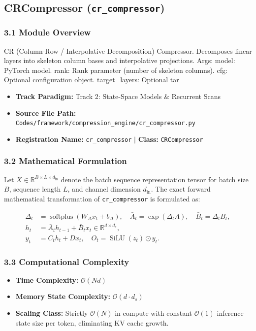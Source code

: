 \subsection{CRCompressor (\texttt{cr\_compressor})}
\label{sec:app_module_cr\_compressor}

\subsubsection*{3.1 Module Overview}
CR (Column-Row / Interpolative Decomposition) Compressor. Decomposes linear layers into skeleton column bases and interpolative projections.  Args:     model: PyTorch model.     rank: Rank parameter (number of skeleton columns).     cfg: Optional configuration object.     target\_layers: Optional tar
\begin{itemize}
    \item \textbf{Track Paradigm:} Track 2: State-Space Models & Recurrent Scans
    \item \textbf{Source File Path:} \texttt{Codes/framework/compression\_engine/cr\_compressor.py}
    \item \textbf{Registration Name:} \texttt{cr\_compressor} $\mid$ \textbf{Class:} \texttt{CRCompressor}
\end{itemize}

\subsubsection*{3.2 Mathematical Formulation}
Let $X \in \mathbb{R}^{B \times L \times d_{\text{in}}}$ denote the batch sequence representation tensor for batch size $B$, sequence length $L$, and channel dimension $d_{\text{in}}$. The exact forward mathematical transformation of \texttt{cr\_compressor} is formulated as:

\begin{align}
\Delta_t &= \operatorname{softplus}(W_\Delta x_t + b_\Delta), \quad \bar{A}_t = \exp(\Delta_t A), \quad \bar{B}_t = \Delta_t B_t, \\
h_t &= \bar{A}_t h_{t-1} + \bar{B}_t x_t \in \mathbb{R}^{d \times d_s}, \\
y_t &= C_t h_t + D x_t, \quad O_t = \operatorname{SiLU}(z_t) \odot y_t.
\end{align}


\subsubsection*{3.3 Computational Complexity}
\begin{itemize}
    \item \textbf{Time Complexity:} $\mathcal{O}(N d)$
    \item \textbf{Memory State Complexity:} $\mathcal{O}(d \cdot d_s)$
    \item \textbf{Scaling Class:} Strictly $\mathcal{O}(N)$ in compute with constant $\mathcal{O}(1)$ inference state size per token, eliminating KV cache growth.
\end{itemize}

